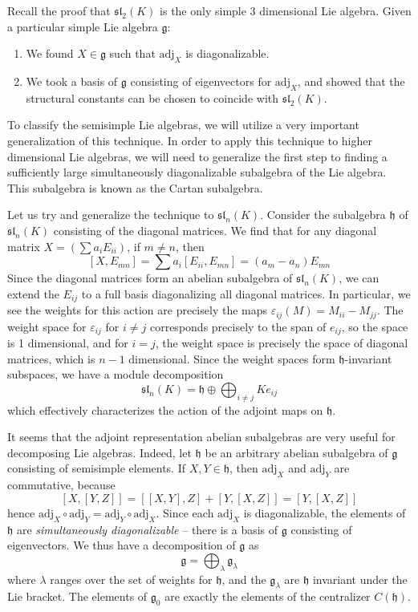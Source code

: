 Recall the proof that $\mathfrak{sl}_2(K)$ is the only simple 3 dimensional Lie algebra. Given a particular simple Lie algebra $\mathfrak{g}$:
%
\begin{enumerate}
    \item We found $X \in \mathfrak{g}$ such that $\text{adj}_X$ is diagonalizable.
    \item We took a basis of $\mathfrak{g}$ consisting of eigenvectors for $\text{adj}_X$, and showed that the structural constants can be chosen to coincide with $\mathfrak{sl}_2(K)$.
\end{enumerate}
%
To classify the semisimple Lie algebras, we will utilize a very important generalization of this technique. In order to apply this technique to higher dimensional Lie algebras, we will need to generalize the first step to finding a sufficiently large simultaneously diagonalizable subalgebra of the Lie algebra. This subalgebra is known as the Cartan subalgebra.

Let us try and generalize the technique to $\mathfrak{sl}_n(K)$. Consider the subalgebra $\mathfrak{h}$ of $\mathfrak{sl}_n(K)$ consisting of the diagonal matrices. We find that for any diagonal matrix $X = (\sum a_i E_{ii})$, if $m \neq n$, then
%
\[ [X,E_{mn}] = \sum a_i [E_{ii}, E_{mn}] = (a_m - a_n) E_{mn} \]
%
Since the diagonal matrices form an abelian subalgebra of $\mathfrak{sl}_n(K)$, we can extend the $E_{ij}$ to a full basis diagonalizing all diagonal matrices. In particular, we see the weights for this action are precisely the maps $\varepsilon_{ij}(M) = M_{ii} - M_{jj}$. The weight space for $\varepsilon_{ij}$ for $i \neq j$ corresponds precisely to the span of $e_{ij}$, so the space is 1 dimensional, and for $i = j$, the weight space is precisely the space of diagonal matrices, which is $n - 1$ dimensional. Since the weight spaces form $\mathfrak{h}$-invariant subspaces, we have a module decomposition
%
\[ \mathfrak{sl}_n(K) = \mathfrak{h} \oplus \bigoplus_{i \neq j} K e_{ij} \]
%
which effectively characterizes the action of the adjoint maps on $\mathfrak{h}$.

It seems that the adjoint representation abelian subalgebras are very useful for decomposing Lie algebras. Indeed, let $\mathfrak{h}$ be an arbitrary abelian subalgebra of $\mathfrak{g}$ consisting of semisimple elements. If $X, Y \in \mathfrak{h}$, then $\text{adj}_X$ and $\text{adj}_Y$ are commutative, because
%
\[ [X,[Y,Z]] = [[X,Y],Z] + [Y,[X,Z]] = [Y,[X,Z]] \]
%
hence $\text{adj}_X \circ \text{adj}_Y = \text{adj}_Y \circ \text{adj}_X$. Since each $\text{adj}_X$ is diagonalizable, the elements of $\mathfrak{h}$ are {\it simultaneously diagonalizable} -- there is a basis of $\mathfrak{g}$ consisting of eigenvectors. We thus have a decomposition of $\mathfrak{g}$ as
%
\[ \mathfrak{g} = \bigoplus_{\lambda} \mathfrak{g}_\lambda \]
%
where $\lambda$ ranges over the set of weights for $\mathfrak{h}$, and the $\mathfrak{g}_\lambda$ are $\mathfrak{h}$ invariant under the Lie bracket. The elements of $\mathfrak{g}_0$ are exactly the elements of the centralizer $C(\mathfrak{h})$.

